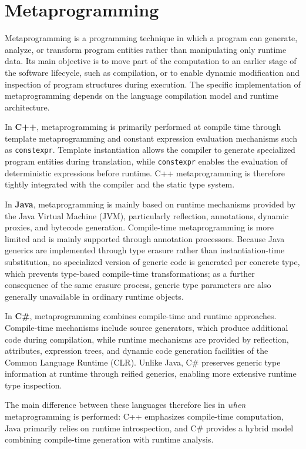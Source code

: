 \documentclass[11pt]{report}
\begin{document}
\chapter{Metaprogramming}
\label{Metaprogramming}
Metaprogramming is a programming technique in which a program can generate,
analyze, or transform program entities rather than manipulating only runtime
data. Its main objective is to move part of the computation to an earlier
stage of the software lifecycle, such as compilation, or to enable dynamic
modification and inspection of program structures during execution. The
specific implementation of metaprogramming depends on the language
compilation model and runtime architecture.

In \textbf{C++}, metaprogramming is primarily performed at compile time
through template metaprogramming and constant expression evaluation
mechanisms such as \texttt{constexpr}. Template instantiation allows the
compiler to generate specialized program entities during translation, while
\texttt{constexpr} enables the evaluation of deterministic expressions
before runtime. C++ metaprogramming is therefore tightly integrated with
the compiler and the static type system.

In \textbf{Java}, metaprogramming is mainly based on runtime mechanisms
provided by the Java Virtual Machine (JVM), particularly reflection,
annotations, dynamic proxies, and bytecode generation. Compile-time
metaprogramming is more limited and is mainly supported through annotation
processors. Because Java generics are implemented through type erasure rather than
instantiation-time substitution, no specialized version of generic code is
generated per concrete type, which prevents type-based compile-time
transformations; as a further consequence of the same erasure process,
generic type parameters are also generally unavailable in ordinary runtime
objects.

In \textbf{C\#}, metaprogramming combines compile-time and runtime
approaches. Compile-time mechanisms include source generators, which
produce additional code during compilation, while runtime mechanisms are
provided by reflection, attributes, expression trees, and dynamic code
generation facilities of the Common Language Runtime (CLR). Unlike Java,
C\# preserves generic type information at runtime through reified
generics, enabling more extensive runtime type inspection.

The main difference between these languages therefore lies in \emph{when}
metaprogramming is performed: C++ emphasizes compile-time computation, Java
primarily relies on runtime introspection, and C\# provides a hybrid model
combining compile-time generation with runtime analysis.
\end{document}
